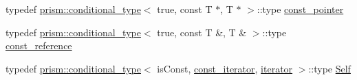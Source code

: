 \begin{DoxyCompactItemize}
typedef \hyperlink{structprism_1_1conditional__type}{prism\+::conditional\+\_\+type}$<$ true, const T $\ast$, T $\ast$ $>$\+::type \hyperlink{structprism_1_1_list_iterator_a26d33cfdcd623863581237968e482a60}{const\+\_\+pointer}
\item 
typedef \hyperlink{structprism_1_1conditional__type}{prism\+::conditional\+\_\+type}$<$ true, const T \&, T \& $>$\+::type \hyperlink{structprism_1_1_list_iterator_a81228a805df7388c2eb9e6500a36ee34}{const\+\_\+reference}
\item 
typedef \hyperlink{structprism_1_1conditional__type}{prism\+::conditional\+\_\+type}$<$ is\+Const, \hyperlink{structprism_1_1_list_iterator_aec39e76f7b988d0718fa4e2aea52ed34}{const\+\_\+iterator}, \hyperlink{structprism_1_1_list_iterator_a91ccdd8512cbc8314d784e39ed4597dd}{iterator} $>$\+::type \hyperlink{structprism_1_1_list_iterator_a54dfed5d1937a612aa2ae524b55f8087}{Self}
\end{DoxyCompactItemize}
